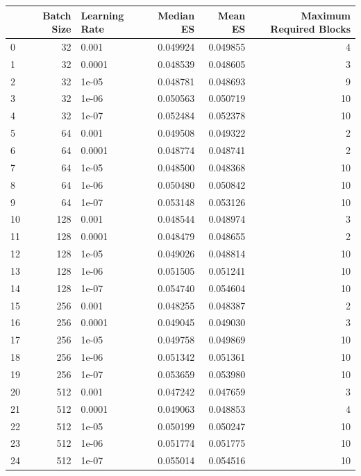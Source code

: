 \begin{tabular}{lrlrrr}
\toprule
 & Batch Size & Learning Rate & Median ES & Mean ES & Maximum Required Blocks \\
\midrule
0 & 32 & 0.001 & 0.049924 & 0.049855 & 4 \\
1 & 32 & 0.0001 & 0.048539 & 0.048605 & 3 \\
2 & 32 & 1e-05 & 0.048781 & 0.048693 & 9 \\
3 & 32 & 1e-06 & 0.050563 & 0.050719 & 10 \\
4 & 32 & 1e-07 & 0.052484 & 0.052378 & 10 \\
5 & 64 & 0.001 & 0.049508 & 0.049322 & 2 \\
6 & 64 & 0.0001 & 0.048774 & 0.048741 & 2 \\
7 & 64 & 1e-05 & 0.048500 & 0.048368 & 10 \\
8 & 64 & 1e-06 & 0.050480 & 0.050842 & 10 \\
9 & 64 & 1e-07 & 0.053148 & 0.053126 & 10 \\
10 & 128 & 0.001 & 0.048544 & 0.048974 & 3 \\
11 & 128 & 0.0001 & 0.048479 & 0.048655 & 2 \\
12 & 128 & 1e-05 & 0.049026 & 0.048814 & 10 \\
13 & 128 & 1e-06 & 0.051505 & 0.051241 & 10 \\
14 & 128 & 1e-07 & 0.054740 & 0.054604 & 10 \\
15 & 256 & 0.001 & 0.048255 & 0.048387 & 2 \\
16 & 256 & 0.0001 & 0.049045 & 0.049030 & 3 \\
17 & 256 & 1e-05 & 0.049758 & 0.049869 & 10 \\
18 & 256 & 1e-06 & 0.051342 & 0.051361 & 10 \\
19 & 256 & 1e-07 & 0.053659 & 0.053980 & 10 \\
20 & 512 & 0.001 & 0.047242 & 0.047659 & 3 \\
21 & 512 & 0.0001 & 0.049063 & 0.048853 & 4 \\
22 & 512 & 1e-05 & 0.050199 & 0.050247 & 10 \\
23 & 512 & 1e-06 & 0.051774 & 0.051775 & 10 \\
24 & 512 & 1e-07 & 0.055014 & 0.054516 & 10 \\
\bottomrule
\end{tabular}
